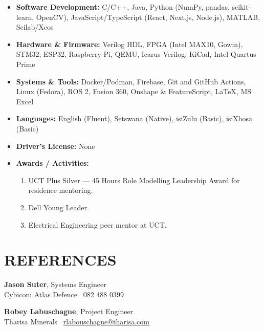 \documentclass[10pt,a4paper]{article}
\begin{document}
\begin{itemize}
  \item \textbf{Software Development:} C/C++, Java, Python (NumPy, pandas, scikit-learn, OpenCV), JavaScript/TypeScript (React, Next.js, Node.js), MATLAB, Scilab/Xcos
  \item \textbf{Hardware \& Firmware:} Verilog HDL, FPGA (Intel MAX10, Gowin), STM32, ESP32, Raspberry Pi, QEMU, Icarus Verilog, KiCad, Intel Quartus Prime
  \item \textbf{Systems \& Tools:} Docker/Podman, Firebase, Git and GitHub Actions, Linux (Fedora), ROS 2, Fusion 360, Onshape \& FeatureScript, \LaTeX, MS Excel
  \item \textbf{Languages:} English (Fluent), Setswana (Native), isiZulu (Basic), isiXhosa (Basic)
  \item \textbf{Driver's License:} None
  \item \textbf{Awards / Activities:}
  \begin{enumerate}[label=\arabic*.]
    \item UCT Plus Silver --- 45 Hours Role Modelling Leadership Award for residence mentoring.
    \item Dell Young Leader.
    \item Electrical Engineering peer mentor at UCT.
  \end{enumerate}
\end{itemize}

\section{REFERENCES}

\noindent
\begin{minipage}[t]{0.5\linewidth}
  {\small\textbf{Jason Suter}, Systems Engineer\\
  Cybicom Atlas Defence \textbullet\ 082 488 0399}
\end{minipage}%
\begin{minipage}[t]{0.5\linewidth}
  {\small\textbf{Robey Labuschagne}, Project Engineer\\
  Tharisa Minerals \textbullet\ \href{mailto:rlabouschagne@tharisa.com}{rlabouschagne@tharisa.com}}
\end{minipage}
\end{document}
